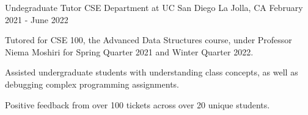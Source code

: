 
\begin{cventries}
    \cventry
      {Undegraduate Tutor}
      {CSE Department at UC San Diego}
      {La Jolla, CA}
      {February 2021 - June 2022}
      {
        \begin{cvitems}
          \item {Tutored for CSE 100, the Advanced Data Structures course, under Professor Niema Moshiri for Spring Quarter 2021 and Winter Quarter 2022.}
          \item {Assisted undergraduate students with understanding class concepts, as well as debugging complex programming assignments.}
          \item {Positive feedback from over 100 tickets across over 20 unique students.}
        \end{cvitems}
      }
\end{cventries}
